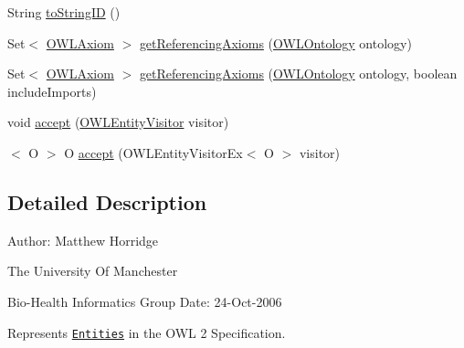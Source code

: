 \begin{DoxyCompactItemize}
\item 
String \hyperlink{interfaceorg_1_1semanticweb_1_1owlapi_1_1model_1_1_o_w_l_entity_a0a9e6b93dd8dc3f7c0ec0353c4eb2b77}{to\-String\-I\-D} ()
\item 
Set$<$ \hyperlink{interfaceorg_1_1semanticweb_1_1owlapi_1_1model_1_1_o_w_l_axiom}{O\-W\-L\-Axiom} $>$ \hyperlink{interfaceorg_1_1semanticweb_1_1owlapi_1_1model_1_1_o_w_l_entity_a6798bb1483fae2538d7d0270be63ab68}{get\-Referencing\-Axioms} (\hyperlink{interfaceorg_1_1semanticweb_1_1owlapi_1_1model_1_1_o_w_l_ontology}{O\-W\-L\-Ontology} ontology)
\item 
Set$<$ \hyperlink{interfaceorg_1_1semanticweb_1_1owlapi_1_1model_1_1_o_w_l_axiom}{O\-W\-L\-Axiom} $>$ \hyperlink{interfaceorg_1_1semanticweb_1_1owlapi_1_1model_1_1_o_w_l_entity_a26e084db514cb89f9f181de9057e21ae}{get\-Referencing\-Axioms} (\hyperlink{interfaceorg_1_1semanticweb_1_1owlapi_1_1model_1_1_o_w_l_ontology}{O\-W\-L\-Ontology} ontology, boolean include\-Imports)
\item 
void \hyperlink{interfaceorg_1_1semanticweb_1_1owlapi_1_1model_1_1_o_w_l_entity_ab25836f09b1f607e80017948eb66a13f}{accept} (\hyperlink{interfaceorg_1_1semanticweb_1_1owlapi_1_1model_1_1_o_w_l_entity_visitor}{O\-W\-L\-Entity\-Visitor} visitor)
\item 
$<$ O $>$ O \hyperlink{interfaceorg_1_1semanticweb_1_1owlapi_1_1model_1_1_o_w_l_entity_a11b743756ce5ef2f432df4d0ea748c96}{accept} (O\-W\-L\-Entity\-Visitor\-Ex$<$ O $>$ visitor)
\end{DoxyCompactItemize}


\subsection{Detailed Description}
Author\-: Matthew Horridge\par
 The University Of Manchester\par
 Bio-\/\-Health Informatics Group Date\-: 24-\/\-Oct-\/2006 

Represents \href{http://www.w3.org/TR/2009/REC-owl2-syntax-20091027/#Entities.2C_Literals.2C_and_Anonymous_Individuals}{\tt Entities} in the O\-W\-L 2 Specification. 

